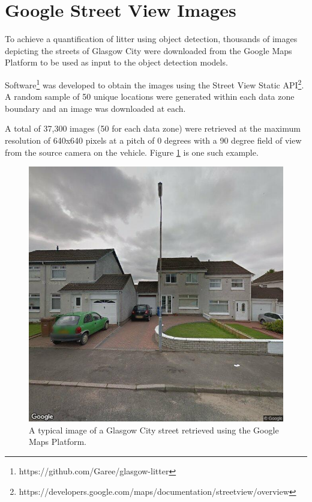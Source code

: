 \documentclass{thesis}
\begin{document}
\section{Google Street View Images}

To achieve a quantification of litter using object detection, thousands of images depicting the streets of Glasgow City were downloaded from the Google Maps Platform to be used as input to the object detection models. 

Software\footnote{https://github.com/Garee/glasgow-litter} was developed to obtain the images using the Street View Static API\footnote{https://developers.google.com/maps/documentation/streetview/overview}. A random sample of 50 unique locations were generated within each data zone boundary and an image was downloaded at each.

A total of 37,300 images (50 for each data zone) were retrieved at the maximum resolution of 640x640 pixels at a pitch of 0 degrees with a 90 degree field of view from the source camera on the vehicle. Figure \ref{fig:street-view-image} is one such example.

\begin{figure}[h]
    \centering
    \includegraphics[scale=0.5]{images/street-view-image.jpg}
    \caption{A typical image of a Glasgow City street retrieved using the Google Maps Platform.}
    \label{fig:street-view-image}
\end{figure}
\end{document}
